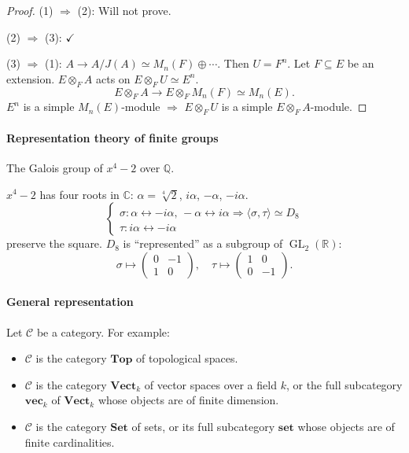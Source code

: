 \documentclass[11pt, a4paper]{report}
\begin{document}
\begin{proof}
(1) $\Rightarrow$ (2): Will not prove.

(2) $\Rightarrow$ (3): $\checkmark$

(3) $\Rightarrow$ (1): $A \to A/J(A) \simeq M_n(F) \oplus \cdots$. Then $U = F^n$. Let $F \subseteq E$ be an extension. $E \otimes_F A$ acts on $E \otimes_F U \simeq E^n$.
\[
E \otimes_F A \to E \otimes_F M_n(F) \simeq M_n(E).
\]
$E^n$ is a simple $M_n(E)$-module $\Rightarrow$ $E \otimes_F U$ is a simple $E \otimes_F A$-module.
\end{proof}

\paragraph{Representation theory of finite groups}

\begin{example}
The Galois group of $x^4 - 2$ over $\mathbb{Q}$.

$x^4 - 2$ has four roots in $\mathbb{C}$: $\alpha = \sqrt[4]{2}$, $i\alpha$, $-\alpha$, $-i\alpha$.
\[
\begin{cases}
\sigma: \alpha \leftrightarrow -i\alpha,\, -\alpha \leftrightarrow i\alpha \Rightarrow \langle \sigma, \tau \rangle \simeq D_8 \\
\tau: i\alpha \leftrightarrow -i\alpha
\end{cases}
\]
preserve the square. $D_8$ is ``represented'' as a subgroup of $\operatorname{GL}_2(\mathbb{R})$:
\[
\sigma \mapsto \begin{pmatrix}
0 & -1 \\
1 & 0
\end{pmatrix}, \quad \tau \mapsto \begin{pmatrix}
1 & 0 \\
0 & -1
\end{pmatrix}.
\]
\end{example}

\paragraph{General representation}
Let $\mathcal{C}$ be a category. For example:
\begin{itemize}
\item $\mathcal{C}$ is the category $\mathbf{Top}$ of topological spaces.
\item $\mathcal{C}$ is the category $\mathbf{Vect}_k$ of vector spaces over a field $k$, or the full subcategory $\mathbf{vec}_k$ of $\mathbf{Vect}_k$ whose objects are of finite dimension.
\item $\mathcal{C}$ is the category $\mathbf{Set}$ of sets, or its full subcategory $\mathbf{set}$ whose objects are of finite cardinalities.
\end{itemize}
\end{document}
